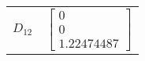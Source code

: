\begin{tabular}{cl}
 $D_{12}$ & $\left[\begin{matrix}0\\0\\1.22474487\end{matrix}\right]$                                                                                                                                                                                                                                                                                                                                                                                                                                                                                                                                                                                                                                                                                                                                                                                                                                                                                                                                                                                                                                                                                                                                                                                                                                                                                                                                                                                                                                                                                                                                                                                                                                                                                                                                                                                                                                                                                                                                                                                                                                                                                                                                                                                                                                                                                                                                                                                                                                                                                                                                                                                                                                                                                                                                                                                                                                                                                                                                                                                                                                                                                                                                                               
\end{tabular}
